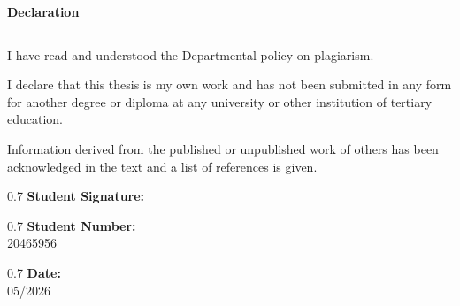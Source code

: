 
\begin{center}
    {\Large \bfseries \textbf{Declaration}}
    \vspace{0.4cm}
    \rule{0.9\textwidth}{0.4pt} %
\end{center}

\vspace{2cm}

\noindent
I have read and understood the Departmental policy on plagiarism.

\medskip %

\noindent
I declare that this thesis is my own work and has not been submitted in any
form for another degree or diploma at any university or other institution of
tertiary education.

\medskip %

\noindent
Information derived from the published or unpublished work of others has been
acknowledged in the text and a list of references is given.



\noindent
\begin{parbox}{0.7\textwidth} %
    \hrulefill \textbf{ Student Signature:}
    \vspace{0.4cm} \\ %
\end{parbox}

\vspace{1.5cm} 

\noindent
\begin{parbox}{0.7\textwidth} %
    \hrulefill \textbf{ Student Number:}
    \vspace{0.4cm} \\ %
    20465956
\end{parbox}

\vspace{1.5cm} 

\noindent
\begin{parbox}{0.7\textwidth} %
    \hrulefill \textbf{ Date:}
    \vspace{0.4cm} \\ %
    05/2026
\end{parbox}

\vspace*{2cm} %


